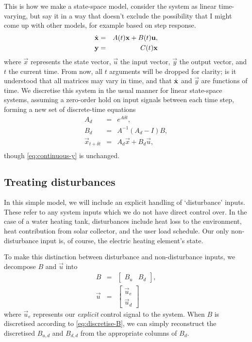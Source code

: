 This is how we make a state-space model, consider the system as linear time-varying, but say it in a way that doesn't exclude the possibility that I might come up with other models, for example based on step response.
\begin{eqnarray}
   \label{eq:continuous-xdot}
   \dot{\mathbf{x}} &=& A(t) \mathbf{x} + B(t) \mathbf{u}, \\
   \label{eq:continuous-y}
   \mathbf{y} &=& C(t) \mathbf{x}
\end{eqnarray}
where $\vec{x}$ represents the state vector, $\vec{u}$ the input vector, $\vec{y}$ the output vector, and $t$ the current time.
From now, all $t$ arguments will be dropped for clarity; is it understood that all matrices may vary in time, and that $\dot{\mathbf{x}}$ and $\vec{y}$ are functions of time.
We discretise this system in the usual manner for linear state-space systems, assuming a zero-order hold on input signals between each time step, forming a new set of discrete-time equations
\begin{eqnarray}
   \label{eq:discretise-A}
   A_d &=& e^{A \delta t}, \\
   \label{eq:discretise-B}
   B_d &=& A^{-1} (A_d - I) B, \\
   \label{eq:discrete-xdot}
   \vec{x}_{t + \delta t} &=& A_d \vec{x} + B_d \vec{u}, \\
\end{eqnarray}
though \autoref{eq:continuous-y} is unchanged.

\subsection{Treating disturbances}

In this simple model, we will include an explicit handling of `disturbance' inputs.
These refer to any system inputs which we do not have direct control over.
In the case of a water heating tank, disturbances include heat loss to the environment, heat contribution from solar collector, and the user load schedule.
Our only non-disturbance input is, of course, the electric heating element's state.

To make this distinction between disturbance and non-disturbance inputs, we decompose $B$ and $\vec{u}$ into
\begin{eqnarray}
   B &=& \left[\begin{array}{cc}
      B_u & B_d
   \end{array}\right], \\
   \vec{u} &=& \left[\begin{array}{c}
      \vec{u}_e \\ \vec{u}_d
   \end{array}\right]
\end{eqnarray}
where $\vec{u}_e$ represents our \emph{explicit} control signal to the system.
When $B$ is discretised according to \autoref{eq:discretise-B}, we can simply reconstruct the discretised $B_{u, d}$ and $B_{d, d}$ from the appropriate columns of $B_d$.

